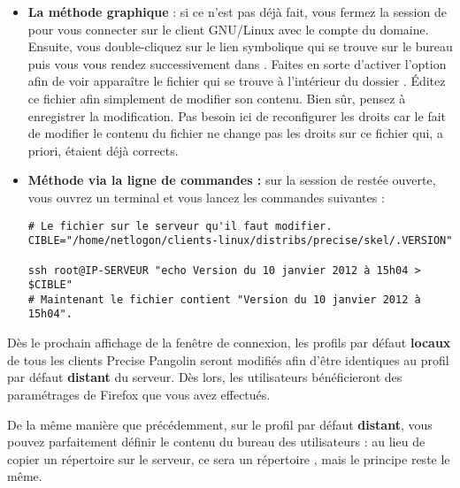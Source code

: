 \begin{enumerate}
\begin{itemize}

\item \textbf{La méthode graphique} : si ce n'est pas déjà fait,
vous fermez la session de  pour vous connecter sur le
client GNU/Linux avec le compte  du domaine.
Ensuite, vous double-cliquez sur le lien symbolique
 qui se trouve sur le bureau puis vous
vous rendez successivement dans  \Vers {}
\Vers {}. Faites en sorte d'activer l'option
\og {} \fg{} afin de voir apparaître
le fichier  qui se trouve à l'intérieur
du dossier . Éditez ce fichier
afin simplement de modifier son contenu.
Bien sûr, pensez à enregistrer la modification. Pas besoin ici
de reconfigurer les droits car le fait de modifier le contenu du fichier
 ne change pas les droits sur ce fichier
qui, a priori, étaient déjà corrects.

\item \textbf{Méthode via la ligne de commandes :} 
sur la session de  restée ouverte, vous ouvrez
un terminal et vous lancez les commandes suivantes :
%
\begin{lstlisting}
# Le fichier sur le serveur qu'il faut modifier.
CIBLE="/home/netlogon/clients-linux/distribs/precise/skel/.VERSION"

ssh root@IP-SERVEUR "echo Version du 10 janvier 2012 à 15h04 > $CIBLE"
# Maintenant le fichier contient "Version du 10 janvier 2012 à 15h04".
\end{lstlisting} %

\end{itemize}

\end{enumerate}



Dès le prochain affichage de la fenêtre de connexion,
les profils par défaut \textbf{locaux} de tous les clients Precise Pangolin
seront modifiés afin d'être identiques au profil par défaut \textbf{distant}
du serveur. Dès lors, les utilisateurs bénéficieront des paramétrages
de Firefox que vous avez effectués.

De la même manière que précédemment, sur le profil par défaut \textbf{distant},
vous pouvez parfaitement définir le contenu du bureau des utilisateurs :
au lieu de copier un répertoire  sur le serveur, ce
sera un répertoire , mais le principe reste le même.


